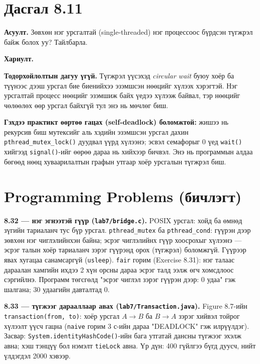 \documentclass[12pt,a4paper]{article}
\newcommand{\question}[2]{\section{Дасгал #1}\textbf{Асуулт.} #2\par\medskip\textbf{Хариулт.}\par}
\begin{document}
\question{8.11}{Зөвхөн нэг урсгалтай (single-threaded) нэг процессоос бүрдсэн түгжрэл байж болох уу? Тайлбарла.}

\textbf{Тодорхойлолтын дагуу үгүй.} Түгжрэл үүсэхэд \emph{circular wait} буюу хоёр ба түүнээс дээш урсгал бие биенийхээ эзэмшсэн нөөцийг хүлээх хэрэгтэй. Нэг урсгалтай процесс нөөцийг эзэмшиж байх үедээ хүлээж байвал, тэр нөөцийг чөлөөлөх өөр урсгал байхгүй тул энэ нь мөчлөг биш.

\textbf{Гэхдээ практикт өөртөө гацах (self-deadlock) боломжтой:} жишээ нь рекурсив биш мутексийг аль хэдийн эзэмшсэн урсгал дахин \texttt{pthread\_mutex\_lock()} дуудвал үүрд хүлээнэ; эсвэл семафорыг 0 үед \texttt{wait()} хийгээд \texttt{signal()}-ийг өөрөө дараа нь хийхээр бичвэл. Энэ нь программын алдаа бөгөөд нөөц хуваарилалтын графын утгаар хоёр урсгалын түгжрэл биш.

\section{Programming Problems (бичлэгт)}

\textbf{8.32 — нэг эгнээтэй гүүр (\texttt{lab7/bridge.c}).} POSIX урсгал: хойд ба өмнөд зүгийн тариаланч тус бүр урсгал. \texttt{pthread\_mutex} ба \texttt{pthread\_cond}: гүүрэн дээр зөвхөн нэг чиглэлийнхэн байна; эсрэг чиглэлийнх гүүр хоосрохыг хүлээнэ — эсрэг талын хоёр тариаланч зэрэг гүүрэнд орох (түгжрэл) боломжгүй. Гүүрээр явах хугацаа санамсаргүй (\texttt{usleep}). \texttt{fair} горим (Exercise 8.31): нэг талаас дараалан хамгийн ихдээ 2 хүн орсны дараа эсрэг талд ээлж өгч хомсдлоос сэргийлнэ. Программ төгсгөлд "эсрэг чиглэл зэрэг гүүрэн дээр: 0 удаа" гэж шалгана; 30 удаагийн давталтад 0.

\textbf{8.33 — түгжээг дарааллаар авах (\texttt{lab7/Transaction.java}).} Figure 8.7-ийн \texttt{transaction(from, to)}: хоёр урсгал $A\to B$ ба $B\to A$ зэрэг хийвэл тойрог хүлээлт үүсч гацна (\texttt{naive} горим 3 с-ийн дараа "DEADLOCK" гэж илрүүлдэг). Засвар: \texttt{System.identityHashCode()}-ийн бага утгатай дансны түгжээг эхэлж авна; хэш тэнцүү бол нэмэлт \texttt{tieLock} авна. Үр дүн: 400 гүйлгээ бүгд дуусч, нийт үлдэгдэл 2000 хэвээр.
\end{document}
